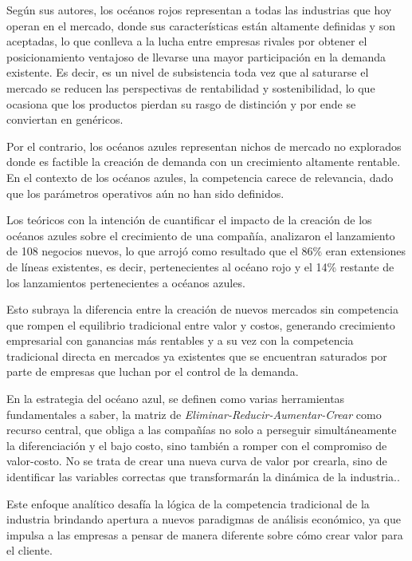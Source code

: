 Según sus autores, los océanos rojos representan a todas las industrias que hoy operan en el mercado, donde sus características están altamente definidas y son aceptadas, lo que conlleva a la lucha entre empresas rivales por obtener el posicionamiento ventajoso de llevarse una mayor participación en la demanda existente. Es decir, es un nivel de subsistencia toda vez que al saturarse el mercado se reducen las perspectivas de rentabilidad y sostenibilidad, lo que ocasiona que los productos pierdan su rasgo de distinción y por ende se conviertan en genéricos.

Por el contrario, los océanos azules representan nichos de mercado no explorados donde es factible la creación de demanda con un crecimiento altamente rentable. En el contexto de los océanos azules, la competencia carece de relevancia, dado que los parámetros operativos aún no han sido definidos.

Los teóricos con la intención de cuantificar el impacto de la creación de los océanos azules sobre el crecimiento de una compañía, analizaron el lanzamiento de 108 negocios nuevos, lo que arrojó como resultado que el 86\% eran extensiones de líneas existentes, es decir, pertenecientes al océano rojo y el 14\% restante de los lanzamientos pertenecientes a océanos azules.

Esto subraya la diferencia entre la creación de nuevos mercados sin competencia que rompen el equilibrio tradicional entre valor y costos, generando crecimiento empresarial con ganancias más rentables y a su vez con la competencia tradicional directa en mercados ya existentes que se encuentran saturados por parte de empresas que luchan por el control de la demanda.

En la estrategia del océano azul, se definen como varias herramientas fundamentales a saber, la matriz de \emph{Eliminar-Reducir-Aumentar-Crear} como recurso central, que \guillemotleft obliga a las compañías no solo a perseguir simultáneamente la diferenciación y el bajo costo, sino también a romper con el compromiso de valor-costo. No se trata de crear una nueva curva de valor por crearla, sino de identificar las variables correctas que transformarán la dinámica de la industria.\guillemotright \parencite{kim2015estrategia}.

Este enfoque analítico desafía la lógica de la competencia tradicional de la industria brindando apertura a nuevos paradigmas de análisis económico, ya que impulsa a las empresas a pensar de manera diferente sobre cómo crear valor para el cliente. 

